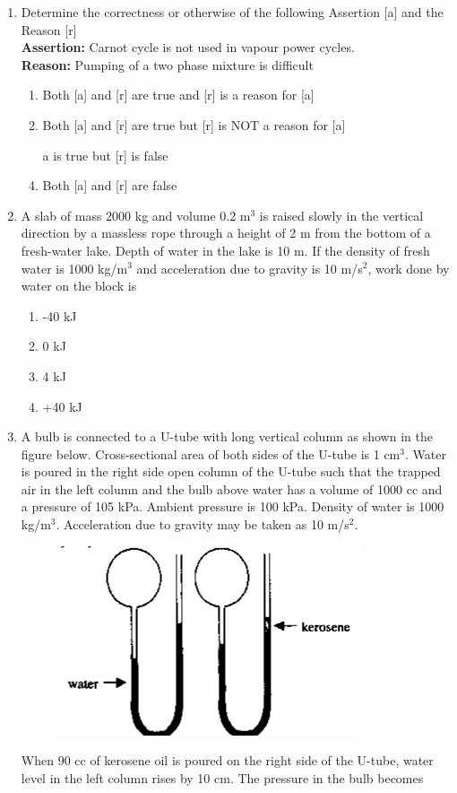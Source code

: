 \documentclass[a4paper,10pt]{article}
\begin{document}
\begin{enumerate}
\item Determine the correctness or otherwise of the following Assertion [a] and the Reason [r] \\
\textbf{Assertion:} Carnot cycle is not used in vapour power cycles. \\
\textbf{Reason:} Pumping of a two phase mixture is difficult
\hfill{}

\begin{enumerate}
\item Both [a] and [r] are true and [r] is a reason for [a]
\item Both [a] and [r] are true but [r] is NOT a reason for [a]
\item [a] is true but [r] is false
\item Both [a] and [r] are false
\end{enumerate}

\item A slab of mass 2000 kg and volume 0.2 m$^3$ is raised slowly in the vertical direction by a massless rope through a height of 2 m from the bottom of a fresh-water lake. Depth of water in the lake is 10 m. If the density of fresh water is 1000 kg/m$^3$ and acceleration due to gravity is 10 m/s$^2$, work done by water on the block is
\hfill{}

\begin{multicols}{4}
\begin{enumerate}
\item -40 kJ
\item 0 kJ
\item 4 kJ
\item +40 kJ
\end{enumerate}
\end{multicols}

\item A bulb is connected to a U-tube with long vertical column as shown in the figure below. Cross-sectional area of both sides of the U-tube is 1 cm$^3$. Water is poured in the right side open column of the U-tube such that the trapped air in the left column and the bulb above water has a volume of 1000 cc and a pressure of 105 kPa. Ambient pressure is 100 kPa. Density of water is 1000 kg/m$^3$. Acceleration due to gravity may be taken as 10 m/s$^2$.
\begin{figure}[H]
    \centering
    \includegraphics[width=0.6\columnwidth]{Eq11.png}
    \caption*{}
    \label{fig:q11_thermo}
\end{figure}
When 90 cc of kerosene oil  is poured on the right side of the U-tube, water level in the left column rises by 10 cm. The pressure in the bulb becomes
\hfill{}


\end{enumerate}
\end{document}

